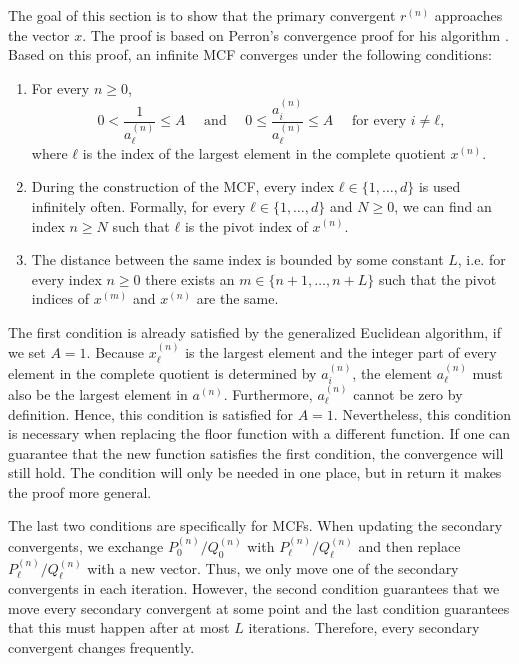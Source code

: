 The goal of this section is to show that the primary convergent $r^{(n)}$ approaches the vector $x$.
The proof is based on Perron's convergence proof for his algorithm \cite{Perron07}.
Based on this proof, an infinite MCF converges under the following conditions:
\begin{enumerate}
  \item
    For every $n ≥ 0$,
    \[
      0 < \frac{1}{a_ℓ^{(n)}} ≤ A
      \quad \text{ and } \quad
      0 ≤ \frac{a_i^{(n)}}{a_ℓ^{(n)}} ≤ A \quad \text{ for every } i ≠ ℓ,
    \]
    where $ℓ$ is the index of the largest element in the complete quotient $x^{(n)}$.
  \item
    During the construction of the MCF,
    every index $ℓ ∈ \{1, …, d\}$ is used infinitely often.
    Formally, for every $ℓ ∈ \{1, …, d\}$ and $N ≥ 0$,
    we can find an index $n ≥ N$ such that $ℓ$ is the pivot index of $x^{(n)}$.
  \item
    The distance between the same index is bounded by some constant $L$,
    i.e. for every index $n ≥ 0$ there exists an $m ∈ \{n+1, …, n+L\}$ such that
    the pivot indices of $x^{(m)}$ and $x^{(n)}$ are the same.
\end{enumerate}

The first condition is already satisfied by the generalized Euclidean algorithm,
if we set $A = 1$.
Because $x_ℓ^{(n)}$ is the largest element
and the integer part of every element in the complete quotient is determined by $a_i^{(n)}$,
the element $a_ℓ^{(n)}$ must also be the largest element in $a^{(n)}$.
Furthermore, $a_ℓ^{(n)}$ cannot be zero by definition.
Hence, this condition is satisfied for $A = 1$.
Nevertheless,
this condition is necessary when replacing the floor function with a different
function.
If one can guarantee that the new function satisfies the first condition, the
convergence will still hold.
The condition will only be needed in one place,
but in return it makes the proof more general.

The last two conditions are specifically for MCFs.
When updating the secondary convergents,
we exchange $P_0^{(n)} / Q_0^{(n)}$ with $P_ℓ^{(n)}/Q_ℓ^{(n)}$
and then replace  $P_ℓ^{(n)}/Q_ℓ^{(n)}$ with a new vector.
Thus, we only move one of the secondary convergents in each iteration.
However, the second condition guarantees that we move every secondary
convergent at some point
and the last condition guarantees that this must happen after at most $L$ iterations.
Therefore, every secondary convergent changes frequently.

